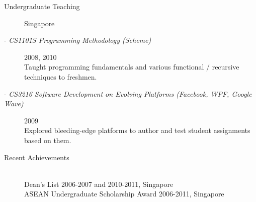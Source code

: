 \documentclass[a4paper]{article}
\begin{document}
\begin{llist}
\vspace{-2ex}
\begin{description}
\item[Undergraduate Teaching \ ] \hfill
Singapore
\item [ - \textit{CS1101S Programming Methodology (Scheme) } ] \hfill
2008, 2010\\
Taught programming fundamentals and various functional / recursive techniques to freshmen.
\item [ - \textit{CS3216 Software Development on Evolving Platforms (Facebook, WPF, Google Wave) } ] \hfill
2009\\
Explored bleeding-edge platforms to author and test student assignments based on them.
\item[Recent Achievements \ ] \hfill
\\
Dean's List \hfill 2006-2007 and 2010-2011, Singapore\\
ASEAN Undergraduate Scholarship Award \hfill 2006-2011, Singapore\\
\end{description}
\end{llist}
\end{document}
